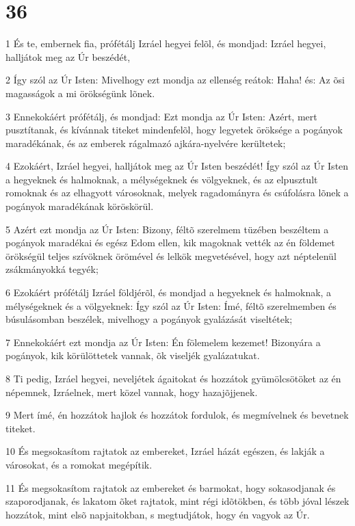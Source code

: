 \chapter{36}

\par 1 És te, embernek fia, prófétálj Izráel hegyei felõl, és mondjad: Izráel hegyei, halljátok meg az Úr beszédét,
\par 2 Így szól az Úr Isten: Mivelhogy ezt mondja az ellenség reátok: Haha! és: Az õsi magasságok a mi örökségünk lõnek.
\par 3 Ennekokáért prófétálj, és mondjad: Ezt mondja az Úr Isten: Azért, mert pusztítanak, és kívánnak titeket mindenfelõl, hogy legyetek öröksége a pogányok maradékának, és az emberek rágalmazó ajkára-nyelvére kerültetek;
\par 4 Ezokáért, Izráel hegyei, halljátok meg az Úr Isten beszédét! Így szól az Úr Isten a hegyeknek és halmoknak, a mélységeknek és völgyeknek, és az elpusztult romoknak és az elhagyott városoknak, melyek ragadományra és csúfolásra lõnek a pogányok maradékának köröskörül.
\par 5 Azért ezt mondja az Úr Isten: Bizony, féltõ szerelmem tüzében beszéltem a pogányok maradékai és egész Edom ellen, kik magoknak vették az én földemet örökségül teljes szívöknek örömével és lelkök megvetésével, hogy azt néptelenül zsákmányokká tegyék;
\par 6 Ezokáért prófétálj Izráel földjérõl, és mondjad a hegyeknek és halmoknak, a mélységeknek és a völgyeknek: Így szól az Úr Isten: Ímé, féltõ szerelmemben és búsulásomban beszélek, mivelhogy a pogányok gyalázását viseltétek;
\par 7 Ennekokáért ezt mondja az Úr Isten: Én fölemelem kezemet! Bizonyára a pogányok, kik körülöttetek vannak, õk viseljék gyalázatukat.
\par 8 Ti pedig, Izráel hegyei, neveljétek ágaitokat és hozzátok gyümölcsötöket az én népemnek, Izráelnek, mert közel vannak, hogy hazajõjjenek.
\par 9 Mert ímé, én hozzátok hajlok és hozzátok fordulok, és megmívelnek és bevetnek titeket.
\par 10 És megsokasítom rajtatok az embereket, Izráel házát egészen, és lakják a városokat, és a romokat megépítik.
\par 11 És megsokasítom rajtatok az embereket és barmokat, hogy sokasodjanak és szaporodjanak, és lakatom õket rajtatok, mint régi idõtökben, és több jóval lészek hozzátok, mint elsõ napjaitokban, s megtudjátok, hogy én vagyok az Úr.

